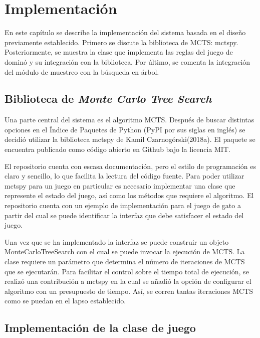 \chapter{Implementación}

\noindent

En este capítulo se describe la implementación del sistema basada en el diseño
previamente establecido. Primero se discute la biblioteca de MCTS: mctspy.
Posteriormente, se muestra la clase que implementa las reglas del juego de
dominó y su integración con la biblioteca. Por último, se comenta la integración
del módulo de muestreo con la búsqueda en árbol.

\section{Biblioteca de \textit{Monte Carlo Tree Search}}

Una parte central del sistema es el algoritmo MCTS. Después de buscar distintas
opciones en el Índice de Paquetes de Python (PyPI por sus siglas en inglés) se
decidió utilizar la biblioteca mctspy de Kamil Czarnogórski(2018a). El paquete
se encuentra publicado como código abierto en Github bajo la licencia MIT.

El repositorio cuenta con escasa documentación, pero el estilo de programación
es claro y sencillo, lo que facilita la lectura del código fuente. Para poder
utilizar mctspy para un juego en particular es necesario implementar una clase
que represente el estado del juego, así como los métodos que requiere el
algoritmo. El repositorio cuenta con un ejemplo de implementación para el juego
de gato a partir del cual se puede identificar la interfaz que debe satisfacer
el estado del juego.

Una vez que se ha implementado la interfaz se puede construir un objeto
MonteCarloTreeSearch con el cual se puede invocar la ejecución de MCTS. La clase
requiere un parámetro que determina el número de iteraciones de MCTS que se
ejecutarán. Para facilitar el control sobre el tiempo total de ejecución, se
realizó una contribución a mctspy en la cual se añadió la opción de configurar
el algoritmo con un presupuesto de tiempo. Así, se corren tantas iteraciones
MCTS como se puedan en el lapso establecido.

\section{Implementación de la clase de juego}

